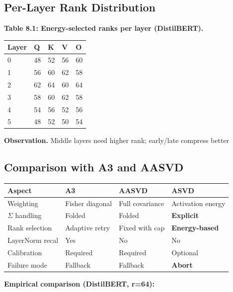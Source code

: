 \subsection{Per-Layer Rank Distribution}

\textbf{Table 8.1: Energy-selected ranks per layer (DistilBERT).}

\begin{table}[H]
\centering
\small
\begin{tabular}{lllll}
\toprule
\textbf{Layer} & \textbf{Q} & \textbf{K} & \textbf{V} & \textbf{O} \\
\midrule
0 & 48 & 52 & 56 & 60 \\
1 & 56 & 60 & 62 & 58 \\
2 & 62 & 64 & 60 & 64 \\
3 & 58 & 60 & 62 & 58 \\
4 & 54 & 56 & 52 & 56 \\
5 & 48 & 52 & 50 & 54 \\
\bottomrule
\end{tabular}
\end{table}

\textbf{Observation.} Middle layers need higher rank; early/late compress better

\subsection{Comparison with A3 and AASVD}

\begin{table}[H]
\centering
\small
\begin{tabular}{llll}
\toprule
\textbf{Aspect} & \textbf{A3} & \textbf{AASVD} & \textbf{ASVD} \\
\midrule
Weighting & Fisher diagonal & Full covariance & Activation energy \\
$\Sigma$ handling & Folded & Folded & \textbf{Explicit} \\
Rank selection & Adaptive retry & Fixed with cap & \textbf{Energy-based} \\
LayerNorm recal & Yes & No & No \\
Calibration & Required & Required & Optional \\
Failure mode & Fallback & Fallback & \textbf{Abort} \\
\bottomrule
\end{tabular}
\end{table}

\textbf{Empirical comparison (DistilBERT, r=64):}

